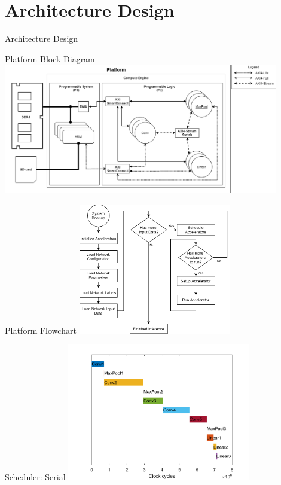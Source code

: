 \setlength{\parskip}{\baselineskip}
\section{Architecture Design}

\begin{frame}
	\huge Architecture Design
\end{frame}

\begin{frame}{Platform Block Diagram}
	\centering
	\includegraphics[width=0.9\textwidth]{../Images/Platform/platform-legend-right.png}\\
\end{frame}

\begin{frame}{Platform Flowchart}
	\centering
	\includegraphics[width=0.5\textwidth]{../Images/Platform/PlatformFlowchart.png}\\
\end{frame}

\begin{frame}{Scheduler: Serial}
	\centering
	\includegraphics[width=0.6\textwidth]{../Images/Scheduling/Serial.png}\\
\end{frame}

